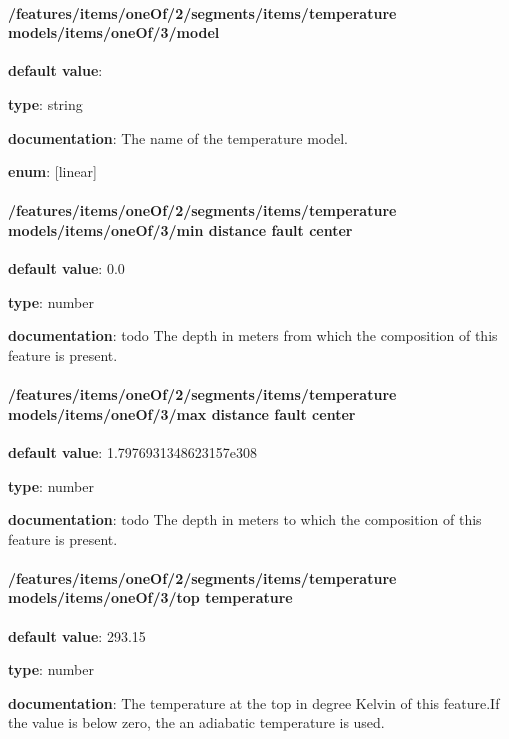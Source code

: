 \paragraph{/features/items/oneOf/2/segments/items/temperature models/items/oneOf/3/model} \begin{itemized}
\item {\bf default value}: 
\item {\bf type}: string
\item {\bf documentation}: The name of the temperature model.
\item {\bf enum}: [linear]\end{itemized}\paragraph{/features/items/oneOf/2/segments/items/temperature models/items/oneOf/3/min distance fault center} \begin{itemized}
\item {\bf default value}: 0.0
\item {\bf type}: number
\item {\bf documentation}: todo The depth in meters from which the composition of this feature is present.
\end{itemized}\paragraph{/features/items/oneOf/2/segments/items/temperature models/items/oneOf/3/max distance fault center} \begin{itemized}
\item {\bf default value}: 1.7976931348623157e308
\item {\bf type}: number
\item {\bf documentation}: todo The depth in meters to which the composition of this feature is present.
\end{itemized}\paragraph{/features/items/oneOf/2/segments/items/temperature models/items/oneOf/3/top temperature} \begin{itemized}
\item {\bf default value}: 293.15
\item {\bf type}: number
\item {\bf documentation}: The temperature at the top in degree Kelvin of this feature.If the value is below zero, the an adiabatic temperature is used.

\end{itemized}
